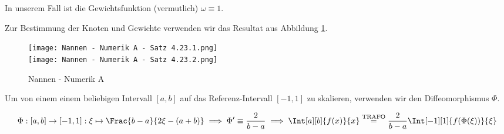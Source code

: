 \begin{solution}

In unserem Fall ist die Gewichtsfunktion (vermutlich) $\omega \equiv 1$.


Zur Bestimmung der Knoten und Gewichte verwenden wir das Resultat aus Abbildung \ref{fig:NNAS4.23}.

\begin{figure}[h!]
  \begin{boxedin}
    \begin{center}
      \texttt{[image: Nannen - Numerik A - Satz 4.23.1.png]} \\
      \vspace{0.5 cm}
      \texttt{[image: Nannen - Numerik A - Satz 4.23.2.png]}
      \caption{Nannen - Numerik A}
      \label{fig:NNAS4.23}
    \end{center}
  \end{boxedin}
\end{figure}

Um von einem einem beliebigen Intervall $[a, b]$ auf das Referenz-Intervall $[-1, 1]$ zu skalieren, verwenden wir den Diffeomorphismus $\Phi$.

\begin{align*}
  \Phi:
  [a, b] \to [-1, 1]:
  \xi \mapsto \Frac{b-a}{2 \xi - (a + b)}
  \implies
  \Phi^\prime \equiv \frac{2}{b - a}
  \implies
  \Int[a][b]{f(x)}{x}
  \stackrel{\text{TRAFO}}{=}
  \frac{2}{b - a}
  \Int[-1][1]{f(\Phi(\xi))}{\xi}
\end{align*}

\end{solution}

